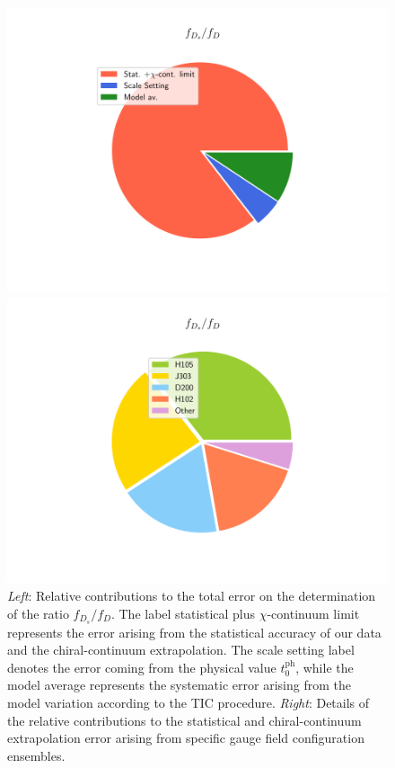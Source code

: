 \begin{figure}
\begin{center}
\begin{minipage}{.4\linewidth}
\includegraphics[width=\linewidth]{././cap6/figs/fds/error_pie_ratio_fds.pdf}
\end{minipage}
\hspace{15mm}
\begin{minipage}{.37\linewidth}
\includegraphics[width=\linewidth]{././cap6/figs/fds/error_pie_ratio_fds_statonly.pdf}
\end{minipage}
\end{center}
\vspace{-5mm}
	\caption{\textit{Left}: Relative contributions to the total error on the determination of the ratio $f_{D_s}/f_D$. The label statistical plus $\chi$-continuum limit represents the error arising from the statistical accuracy of our data and the chiral-continuum extrapolation. The scale setting label denotes the error coming from the physical value $t_0^{\mathrm{ph}}$, while the model average represents the systematic error arising from the model variation according to the TIC procedure. \textit{Right}: Details of the relative contributions to the statistical and chiral-continuum extrapolation error arising from specific gauge field configuration ensembles. 
          }
	    \label{fig:fds_ratio_error}
\end{figure}

